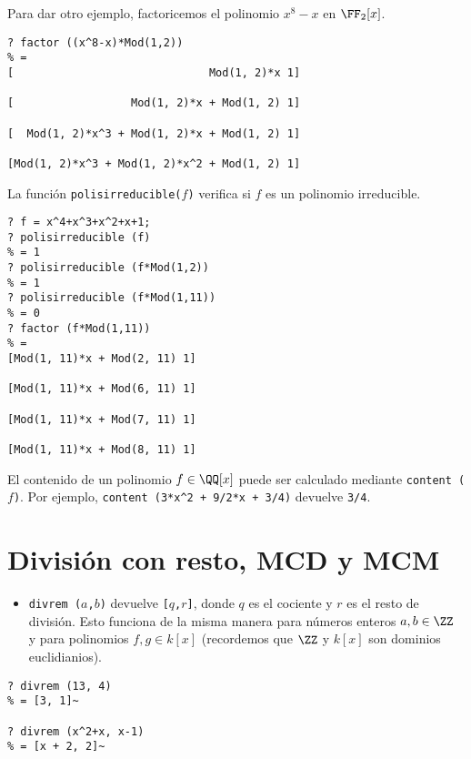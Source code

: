 Para dar otro ejemplo, factoricemos el polinomio $x^8-x$ en $\FF_2 [x]$.

\begin{framed}\footnotesize
\begin{verbatim}
? factor ((x^8-x)*Mod(1,2))
% = 
[                              Mod(1, 2)*x 1]

[                  Mod(1, 2)*x + Mod(1, 2) 1]

[  Mod(1, 2)*x^3 + Mod(1, 2)*x + Mod(1, 2) 1]

[Mod(1, 2)*x^3 + Mod(1, 2)*x^2 + Mod(1, 2) 1]
\end{verbatim}
\end{framed}

La función \texttt{polisirreducible($f$)} verifica si $f$ es un polinomio
irreducible.

\begin{framed}\footnotesize
\begin{verbatim}
? f = x^4+x^3+x^2+x+1;
? polisirreducible (f)
% = 1
? polisirreducible (f*Mod(1,2))
% = 1
? polisirreducible (f*Mod(1,11))
% = 0
? factor (f*Mod(1,11))
% = 
[Mod(1, 11)*x + Mod(2, 11) 1]

[Mod(1, 11)*x + Mod(6, 11) 1]

[Mod(1, 11)*x + Mod(7, 11) 1]

[Mod(1, 11)*x + Mod(8, 11) 1]
\end{verbatim}
\end{framed}

El contenido de un polinomio $f \in \QQ [x]$ puede ser calculado mediante
\texttt{content\,($f$)}. Por ejemplo, \texttt{content\,(3*x\^{}2 + 9/2*x + 3/4)}
devuelve \texttt{3/4}.


\section{División con resto, MCD y MCM}

\begin{itemize}
\item \texttt{divrem\,($a$,$b$)} devuelve \texttt{[$q$,$r$]}, donde $q$ es
  el cociente y $r$ es el resto de división. Esto funciona de la misma manera
  para números enteros $a,b\in \ZZ$ y para polinomios $f,g \in k [x]$
  (recordemos que $\ZZ$ y $k [x]$ son dominios euclidianios).
\end{itemize}

\begin{framed}\footnotesize
\begin{verbatim}
? divrem (13, 4)
% = [3, 1]~

? divrem (x^2+x, x-1)
% = [x + 2, 2]~
\end{verbatim}
\end{framed}

